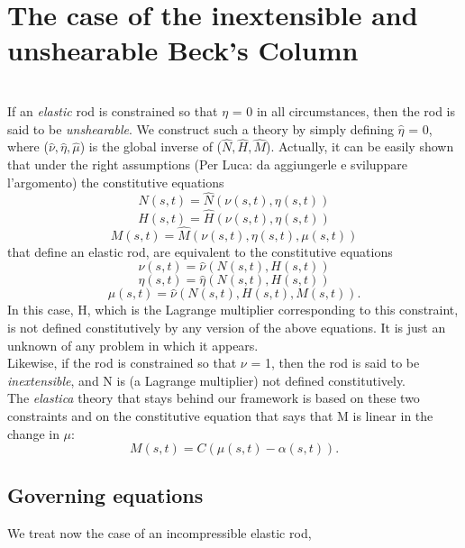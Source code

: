 
\section{The case of the inextensible and unshearable Beck's Column}

\\
If an \emph{elastic} rod is constrained so that $\eta$ = 0 in all circumstances, then the rod is said to be \emph{unshearable}.
We construct such a theory by simply defining $\hat{\eta}$ = 0, where ($\hat{\nu},\hat{\eta},\hat{\mu}$) is the global inverse of ($\hat{N},\hat{H},\hat{M}$). Actually, it can be easily shown that under the right assumptions (Per Luca: da aggiungerle e sviluppare l'argomento) the constitutive equations 
\[  N (s,t)=  \hat{N}(\nu (s,t),\eta (s,t))
\]
\[  H (s,t)=  \hat{H}(\nu (s,t),\eta (s,t)) 
\]
\[  M (s,t)=  \hat{M}(\nu (s,t),\eta (s,t), \mu(s,t))
\]
that define an elastic rod, are equivalent to the constitutive equations
\[  \nu (s,t)=  \hat{\nu}(N(s,t),H(s,t))
\]
\[  \eta (s,t)=  \hat{\eta}(N(s,t),H(s,t)) 
\]
\[  \mu (s,t)=  \hat{\nu}(N(s,t), H(s,t), M(s,t)).
\]
In this case, H, which is the Lagrange multiplier corresponding to this constraint, is not defined constitutively by any version of the above equations. It is just an unknown of any problem in which it appears.
\\
Likewise, if the rod is constrained so that $\nu$ = 1, then the rod is said to be \emph{inextensible}, and N is (a Lagrange multiplier) not defined constitutively.\\
The \emph{elastica} theory that stays behind our framework is based on these two constraints and on the constitutive equation that says that M is linear in the change in $\mu$:
\[
M(s,t) = C(\mu(s,t) − \alpha(s,t)).
\]

\subsection{Governing equations}
We treat now the case of an incompressible elastic rod,
